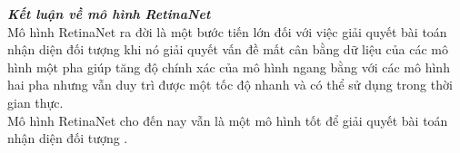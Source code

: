 {    %


    \noindent
    \textbf{\textit{Kết luận về mô hình RetinaNet}} \\
    Mô hình RetinaNet  ra đời là một bước tiến lớn đối với việc giải quyết bài toán nhận diện đối tượng  khi nó giải quyết vấn đề mất cân bằng dữ liệu  của các mô hình một pha  giúp tăng độ chính xác của mô hình ngang bằng với các mô hình hai pha  nhưng vẫn duy trì được một tốc độ nhanh và có thể sử dụng trong thời gian thực. \\
    Mô hình RetinaNet  cho đến nay vẫn là một mô hình tốt để giải quyết bài toán nhận diện đối tượng .
}